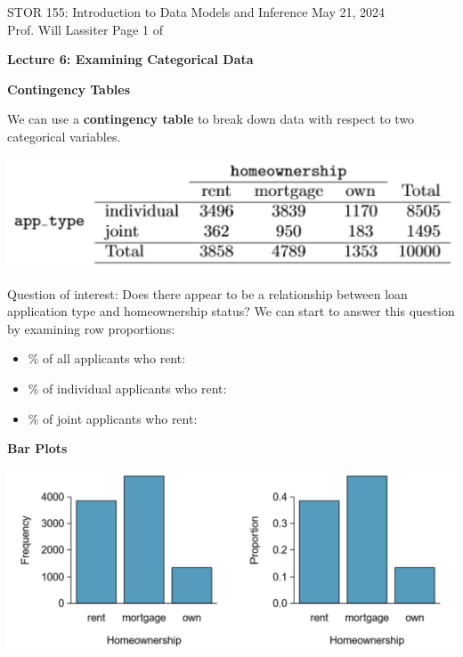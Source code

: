 \documentclass[11pt,letterpaper,twoside]{article}
\newcommand{\whatizit}{Lecture 6: Examining Categorical Data}
\begin{document}
\thispagestyle{empty} \vspace*{-0.75in}

{\bssten STOR 155: Introduction to Data Models and Inference \hfill May 21, 2024 \\
Prof. Will Lassiter  \hfill Page 1 of \pageref{totalpag}}
\vspace{10pt}
\begin{center} {{\Large \bf \whatizit}} \end{center}

{\bf Contingency Tables} \vspace{6pt}

We can use a {\bf contingency table} to break down data with respect to two categorical variables.

\begin{center}
\includegraphics[scale=0.7]{images/contingency.png}
\end{center}

Question of interest: Does there appear to be a relationship between loan application type and homeownership status? We can start to answer this question by examining row proportions:

\begin{itemize}

\item \% of all applicants who rent: \vspace{20pt}

\item \% of individual applicants who rent: \vspace{20pt}

\item \% of joint applicants who rent: \vspace{40pt}
\end{itemize}

{\bf Bar Plots}


\begin{center}
\includegraphics[scale=0.8]{images/barplot.png}
\end{center}
\end{document}
